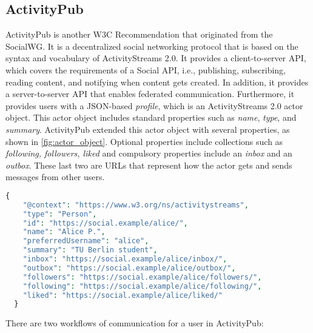 \subsection{ActivityPub}\label{subsec:activitypub}

ActivityPub is another W3C Recommendation that originated from the SocialWG. It is a decentralized social networking protocol that is based on the syntax and vocabulary of ActivityStreams 2.0. It provides a client-to-server API, which covers the requirements of a Social API\cite{guy_2017}, i.e., publishing, subscribing, reading content, and notifying when content gets created. In addition, it provides a server-to-server API that enables federated communication. Furthermore, it provides users with a JSON-based \emph{profile}, which is an ActivityStreams 2.0 actor object. This actor object includes standard properties such as \emph{name}, \emph{type}, and \emph{summary}. ActivityPub extended this actor object with several properties, as shown in \ref{fig:actor_object}. Optional properties include collections such as \emph{following, followers, liked} and compulsory properties include an \emph{inbox} and an \emph{outbox}. These last two are URLs that represent how the actor gets and sends messages from other users.


\lstset{style=JSONStyle}
\begin{lstlisting}[language=PHP, caption=Actor object example in ActivityPub \cite{lemmer-webber_tallon_guy_prodromou_2018}, label=fig:actor_object, float=h!]
  {
    "@context": "https://www.w3.org/ns/activitystreams",
    "type": "Person",
    "id": "https://social.example/alice/",
    "name": "Alice P.",
    "preferredUsername": "alice",
    "summary": "TU Berlin student",
    "inbox": "https://social.example/alice/inbox/",
    "outbox": "https://social.example/alice/outbox/",
    "followers": "https://social.example/alice/followers/",
    "following": "https://social.example/alice/following/",
    "liked": "https://social.example/alice/liked/"
  }
\end{lstlisting}

There are two workflows of communication for a user in ActivityPub: \label{subsec:ap_workflows}

